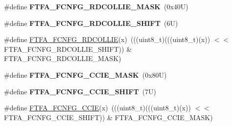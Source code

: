 \begin{DoxyCompactItemize}
\#define {\bfseries F\+T\+F\+A\+\_\+\+F\+C\+N\+F\+G\+\_\+\+R\+D\+C\+O\+L\+L\+I\+E\+\_\+\+M\+A\+SK}~(0x40\+U)
\item 
\mbox{\label{group___f_t_f_a___register___masks_gaea7f60637733465718c684ca9c4612f6}} 
\#define {\bfseries F\+T\+F\+A\+\_\+\+F\+C\+N\+F\+G\+\_\+\+R\+D\+C\+O\+L\+L\+I\+E\+\_\+\+S\+H\+I\+FT}~(6\+U)
\item 
\#define \mbox{\hyperlink{group___f_t_f_a___register___masks_ga82b49207b9172fd4f3b6eccb5f8b9236}{F\+T\+F\+A\+\_\+\+F\+C\+N\+F\+G\+\_\+\+R\+D\+C\+O\+L\+L\+IE}}(x)~(((uint8\+\_\+t)(((uint8\+\_\+t)(x)) $<$$<$ F\+T\+F\+A\+\_\+\+F\+C\+N\+F\+G\+\_\+\+R\+D\+C\+O\+L\+L\+I\+E\+\_\+\+S\+H\+I\+FT)) \& F\+T\+F\+A\+\_\+\+F\+C\+N\+F\+G\+\_\+\+R\+D\+C\+O\+L\+L\+I\+E\+\_\+\+M\+A\+SK)
\item 
\mbox{\label{group___f_t_f_a___register___masks_gad7b9ee7d7ca0f897784ed211030e6e8f}} 
\#define {\bfseries F\+T\+F\+A\+\_\+\+F\+C\+N\+F\+G\+\_\+\+C\+C\+I\+E\+\_\+\+M\+A\+SK}~(0x80\+U)
\item 
\mbox{\label{group___f_t_f_a___register___masks_ga7032f590fbfc9a43d13109688eb3a4c0}} 
\#define {\bfseries F\+T\+F\+A\+\_\+\+F\+C\+N\+F\+G\+\_\+\+C\+C\+I\+E\+\_\+\+S\+H\+I\+FT}~(7\+U)
\item 
\#define \mbox{\hyperlink{group___f_t_f_a___register___masks_ga865557a904c8180ddaec175392cb282e}{F\+T\+F\+A\+\_\+\+F\+C\+N\+F\+G\+\_\+\+C\+C\+IE}}(x)~(((uint8\+\_\+t)(((uint8\+\_\+t)(x)) $<$$<$ F\+T\+F\+A\+\_\+\+F\+C\+N\+F\+G\+\_\+\+C\+C\+I\+E\+\_\+\+S\+H\+I\+FT)) \& F\+T\+F\+A\+\_\+\+F\+C\+N\+F\+G\+\_\+\+C\+C\+I\+E\+\_\+\+M\+A\+SK)
\end{DoxyCompactItemize}
